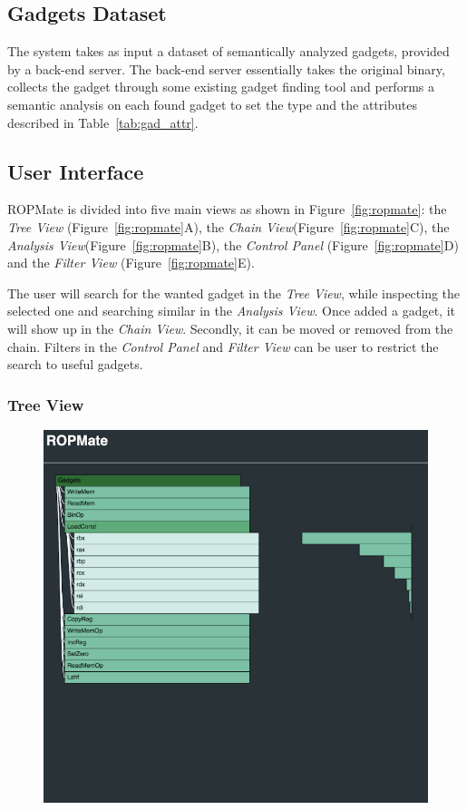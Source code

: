 \documentclass[twocolumn, 11pt]{article}
\begin{document}
\subsection{Gadgets Dataset} The system takes as input a dataset of semantically analyzed gadgets, provided by a back-end server. The back-end server essentially takes the original binary, collects the gadget through some existing gadget finding tool and performs a semantic analysis on each found gadget to set the type and the attributes described in Table~\ref{tab:gad_attr}.

\subsection{User Interface}
ROPMate is divided into five main views as shown in Figure~\ref{fig:ropmate}: the \textit{Tree View} (Figure~\ref{fig:ropmate}A), the \textit{Chain View}(Figure~\ref{fig:ropmate}C), the \textit{Analysis View}(Figure~\ref{fig:ropmate}B), the \textit{Control Panel} (Figure~\ref{fig:ropmate}D) and the \textit{Filter View} (Figure~\ref{fig:ropmate}E).

The user will search for the wanted gadget in the \textit{Tree View}, while inspecting the selected one and searching similar in the \textit{Analysis View}. Once added a gadget, it will show up in the \textit{Chain View}. Secondly, it can be moved or removed from the chain. Filters in the \textit{Control Panel} and \textit{Filter View} can be user to restrict the search to useful gadgets.

\subsubsection{Tree View}
\begin{figure}[htb]
  \centering
  \includegraphics[width=0.6\linewidth]{tree-view}
\end{figure}
\end{document}
